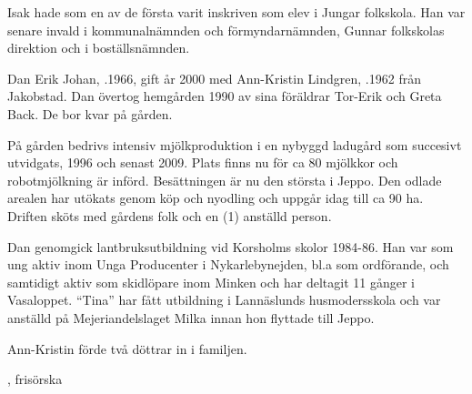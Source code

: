 Isak hade som en av de första varit inskriven som elev i Jungar folkskola. Han var senare invald i kommunalnämnden och förmyndarnämnden, Gunnar folkskolas direktion och i boställsnämnden.
\begin{jhchildren}
  \item {}
  \item {}
  \item {}
  \item {}
  \item {}
  \item {}
  \item {}
\end{jhchildren}






Dan Erik Johan, .1966, gift år 2000 med Ann-Kristin Lindgren, .1962 från Jakobstad. Dan övertog hemgården 1990 av sina  föräldrar Tor-Erik och Greta Back. De bor kvar på gården.

På gården bedrivs intensiv mjölkproduktion i en nybyggd ladugård som succesivt utvidgats, 1996 och senast 2009. Plats finns nu för ca 80 mjölkkor och robotmjölkning är införd. Besättningen är nu den största i Jeppo. Den odlade arealen har utökats genom köp och nyodling och uppgår idag till ca 90 ha. Driften sköts med gårdens folk och en (1) anställd person.

Dan genomgick lantbruksutbildning vid Korsholms skolor 1984-86. Han var som ung aktiv inom Unga Producenter i Nykarlebynejden, bl.a som ordförande, och samtidigt aktiv som skidlöpare inom Minken och har deltagit 11 gånger i Vasaloppet. ``Tina'' har fått utbildning i Lannäslunds husmodersskola och var anställd på Mejeriandelslaget Milka innan hon flyttade till Jeppo.

Ann-Kristin förde två döttrar in i familjen.
\begin{jhchildren}
  \item {}, frisörska
  \item {}
\end{jhchildren}


